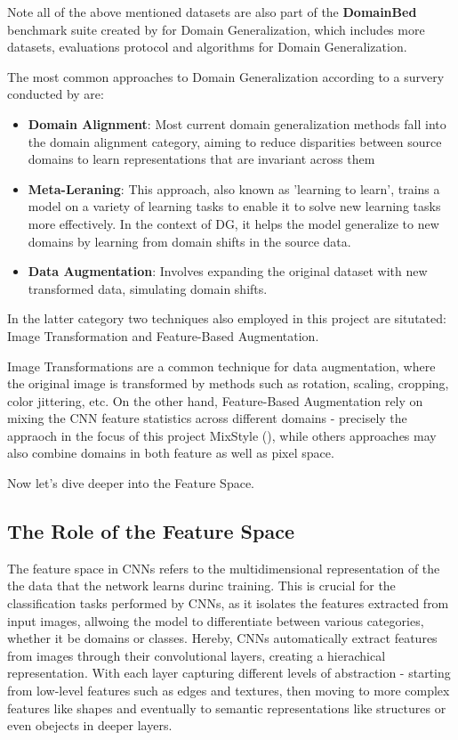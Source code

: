 Note all of the above mentioned datasets are also part of the \textbf{DomainBed} benchmark suite created by \cite{gulrajaniSearchLostDomain2020} for Domain Generalization, which includes more datasets, evaluations protocol and algorithms for Domain Generalization.

The most common approaches to Domain Generalization according to a survery conducted by \cite{zhouDomainGeneralizationSurvey2022} are: %
\begin{itemize}
 \item \textbf{Domain Alignment}: Most current domain generalization methods fall into the domain alignment category, aiming to reduce disparities between source domains to learn representations that are invariant across them
 \item \textbf{Meta-Leraning}: This approach, also known as 'learning to learn', trains a model on a variety of learning tasks to enable it to solve new learning tasks more effectively. In the context of DG, it helps the model generalize to new domains by learning from domain shifts in the source data.
 \item \textbf{Data Augmentation}: Involves expanding the original dataset with new transformed data, simulating domain shifts.
\end{itemize}

In the latter category two techniques also employed in this project are situtated:
Image Transformation and Feature-Based Augmentation.

Image Transformations are a common technique for data augmentation, where the original image is transformed by methods such as rotation, scaling, cropping, color jittering, etc.
On the other hand, Feature-Based Augmentation rely on mixing the CNN feature statistics across different domains - precisely the appraoch in the focus of this project MixStyle (\cite{zhouMixStyleNeuralNetworks2023}), while others approaches may also combine domains in both feature as well as pixel space.

Now let's dive deeper into the Feature Space.
\subsection{The Role of the Feature Space}
The feature space in CNNs refers to the multidimensional representation of the the data that the network learns durinc training. This is crucial for the classification tasks performed by CNNs, as it isolates the features extracted from input images, allwoing the model to differentiate between various categories, whether it be domains or classes.
Hereby, CNNs automatically extract features from images through their convolutional layers, creating a hierachical representation. With each layer capturing different levels of abstraction - starting from low-level features such as edges and textures, then moving to more complex features like shapes and eventually to semantic representations like structures or even obejects in deeper layers. \cite{zeilerVisualizingUnderstandingConvolutional2013,goodfellowDeepLearning2016}

